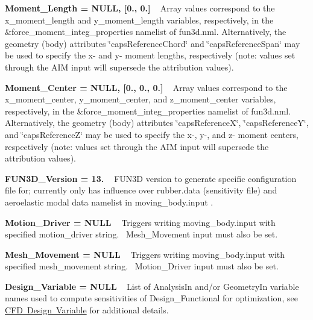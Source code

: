 \begin{DoxyItemize}
\item {\bfseries{Moment\+\_\+\+Length = NULL, \mbox{[}0., 0.\mbox{]}}} ~\newline
 Array values correspond to the x\+\_\+moment\+\_\+length and y\+\_\+moment\+\_\+length variables, respectively, in the \&force\+\_\+moment\+\_\+integ\+\_\+properties namelist of fun3d.\+nml. Alternatively, the geometry (body) attributes \char`\"{}caps\+Reference\+Chord\char`\"{} and \char`\"{}caps\+Reference\+Span\char`\"{} may be used to specify the x-\/ and y-\/ moment lengths, respectively (note\+: values set through the AIM input will supersede the attribution values).
\item {\bfseries{Moment\+\_\+\+Center = NULL, \mbox{[}0., 0., 0.\mbox{]}}} ~\newline
 Array values correspond to the x\+\_\+moment\+\_\+center, y\+\_\+moment\+\_\+center, and z\+\_\+moment\+\_\+center variables, respectively, in the \&force\+\_\+moment\+\_\+integ\+\_\+properties namelist of fun3d.\+nml. Alternatively, the geometry (body) attributes \char`\"{}caps\+Reference\+X\char`\"{}, \char`\"{}caps\+Reference\+Y\char`\"{}, and \char`\"{}caps\+Reference\+Z\char`\"{} may be used to specify the x-\/, y-\/, and z-\/ moment centers, respectively (note\+: values set through the AIM input will supersede the attribution values).
\item {\bfseries{FUN3\+D\+\_\+\+Version = 13. }} ~\newline
 FUN3D version to generate specific configuration file for; currently only has influence over rubber.\+data (sensitivity file) and aeroelastic modal data namelist in moving\+\_\+body.\+input .
\item {\bfseries{Motion\+\_\+\+Driver = NULL }} ~\newline
 Triggers writing moving\+\_\+body.\+input with specified \textquotesingle{}motion\+\_\+driver\textquotesingle{} string.~\newline
 Mesh\+\_\+\+Movement input must also be set.
\item {\bfseries{Mesh\+\_\+\+Movement = NULL }} ~\newline
 Triggers writing moving\+\_\+body.\+input with specified \textquotesingle{}mesh\+\_\+movement\textquotesingle{} string.~\newline
 Motion\+\_\+\+Driver input must also be set.
\item {\bfseries{ Design\+\_\+\+Variable = NULL}} ~\newline
 List of Analysis\+In and/or Geometry\+In variable names used to compute sensitivities of Design\+\_\+\+Functional for optimization, see \mbox{\hyperlink{cfdDesignVariable}{CFD Design Variable}} for additional details.

\end{DoxyItemize}

